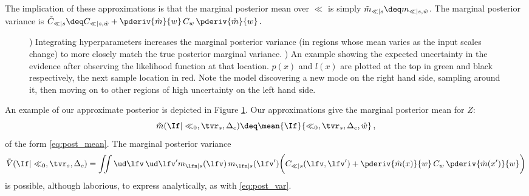 \documentclass{article} %
\begin{document}
The implication of these approximations is that the marginal posterior mean over $\ll$ is simply
$
\tilde{m}_{\ll|s} \deq m_{\ll|s,\hat{w}}
$.   
The marginal posterior variance is 
$
\tilde{C}_{\ll|s} 
\deq C_{\ll|s,\hat{w}}
+ 
\pderiv{\hat{m}}{w}
\,C_w\,
\pderiv{\hat{m}}{w}\,.
$
%
\begin{figure}
	\begin{subfigure}[b]{6cm}
		\caption{}
		\label{fig:integrate_hypers}
	\end{subfigure}
\hspace{-1cm}
	\begin{subfigure}[b]{8cm}
		\caption{}
		 \label{fig:eue}
	\end{subfigure}
\caption{) Integrating hyperparameters increases the marginal posterior variance (in regions whose mean varies as the input scales change) to more closely match the true posterior marginal variance. ) An example showing the expected uncertainty in the evidence after observing the likelihood function at that location. $p(x)$ and $l(x)$ are plotted at the top in green and black respectively, the next sample location in red.  Note the model discovering a new mode on the right hand side, sampling around it, then moving on to other regions of high uncertainty on the left hand side. }
\end{figure}
%
%
An example of our approximate posterior is depicted in Figure  \ref{fig:integrate_hypers}.
Our approximations give the marginal posterior mean for $Z$:
\begin{equation}
\tilde{m}(\If|\ll_0,\tvr_s,\Delta_c) \deq \mean{\If}{\ll_0,\tvr_s,\Delta_c, \hat{w}}\,,
\end{equation}
of the form \eqref{eq:post_mean}. The marginal posterior variance
\begin{align}
\tilde{V}(\If|\ll_0,\tvr_s,\Delta_c)=
\iint\ud \lfv\, \ud\lfv' m_{\lfn|s}(\lfv)\, m_{\lfn|s}(\lfv') 
\biggl(C_{\ll|s}(\lfv,\lfv') + 
\pderiv{\hat{m}(x)}{w}
\,C_w\,
\pderiv{\hat{m}(x')}{w}
\biggr)
\end{align}
is possible, although laborious, to express analytically, as with \eqref{eq:post_var}. 

\end{document}
